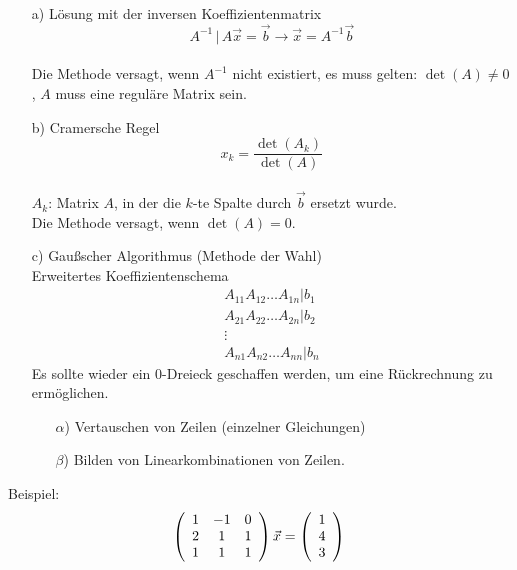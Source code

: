 \documentclass{article}
\begin{document}
\begin{itemize}
    \item[a)] Lösung mit der inversen Koeffizientenmatrix\\
    \begin{equation*}
        A^{-1}\,|\,A\vec{x} = \vec{b} \rightarrow \vec{x} = A^{-1}\vec{b}
    \end{equation*}\\
    Die Methode versagt, wenn $A^{-1}$ nicht existiert, es muss gelten: $\det(A) \neq 0$, $A$ muss eine reguläre Matrix sein.
    \item[b)]Cramersche Regel\\
    \begin{equation*}
        x_k = \frac{\det(A_k)}{\det(A)}
    \end{equation*}\\
    $A_k$: Matrix $A$, in der die $k$-te Spalte durch $\vec{b}$ ersetzt wurde.\\
    Die Methode versagt, wenn $\det(A) = 0$.
    \item[c)]Gaußscher Algorithmus (Methode der Wahl)\\
    Erweitertes Koeffizientenschema
    \begin{eqnarray*}
        A_{11} A_{12} \dots A_{1n} | b_1\\
        A_{21} A_{22} \dots A_{2n} | b_2\\
        \vdots\\
        A_{n1} A_{n2} \dots A_{nn} | b_n
    \end{eqnarray*}
    Es sollte wieder ein 0-Dreieck geschaffen werden, um eine Rückrechnung zu ermöglichen.\\
    \begin{itemize}
        \item[$\alpha$)]Vertauschen von Zeilen (einzelner Gleichungen)
        \item[$\beta$)] Bilden von Linearkombinationen von Zeilen.
    \end{itemize}
\end{itemize}
Beispiel:
\begin{equation*}
    \left(\begin{array}{c c c}1&-1&0\\2&1&1\\1&1&1\end{array}\right) \vec{x} = \left(\begin{array}{c}1\\4\\3\end{array}\right)\\
\end{equation*}
\end{document}
